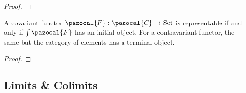 \begin{proof}
    
\end{proof}
\begin{proposition}
    A covariant functor $\pazocal{F} : \pazocal{C}\rightarrow \mathrm{Set}$ is representable if and only if $\int \pazocal{F}$ has an initial object. For a contravariant functor, the same but the category of elements has a terminal object.  
\end{proposition}
\begin{proof}
    
\end{proof}
\subsection{Limits \& Colimits}
